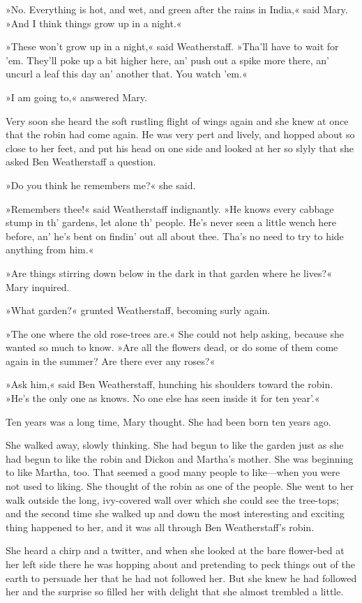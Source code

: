 »No. Everything is hot, and wet, and green after the rains in India,« said Mary. »And I think things grow up in a night.«

»These won't grow up in a night,« said Weatherstaff. »Tha'll have to wait for 'em. They'll poke up a bit higher here, an' push out a spike more there, an' uncurl a leaf this day an' another that. You watch 'em.«

»I am going to,« answered Mary.

Very soon she heard the soft rustling flight of wings again and she knew at once that the robin had come again. He was very pert and lively, and hopped about so close to her feet, and put his head on one side and looked at her so slyly that she asked Ben Weatherstaff a question.

»Do you think he remembers me?« she said.

»Remembers thee!« said Weatherstaff indignantly. »He knows every cabbage stump in th' gardens, let alone th' people. He's never seen a little wench here before, an' he's bent on findin' out all about thee. Tha's no need to try to hide anything from him.«

»Are things stirring down below in the dark in that garden where he lives?« Mary inquired.

»What garden?« grunted Weatherstaff, becoming surly again.

»The one where the old rose-trees are.« She could not help asking, because she wanted so much to know. »Are all the flowers dead, or do some of them come again in the summer? Are there ever any roses?«

»Ask him,« said Ben Weatherstaff, hunching his shoulders toward the robin. »He's the only one as knows. No one else has seen inside it for ten year'.«

Ten years was a long time, Mary thought. She had been born ten years ago.

She walked away, slowly thinking. She had begun to like the garden just as she had begun to like the robin and Dickon and Martha's mother. She was beginning to like Martha, too. That seemed a good many people to like—when you were not used to liking. She thought of the robin as one of the people. She went to her walk outside the long, ivy-covered wall over which she could see the tree-tops; and the second time she walked up and down the most interesting and exciting thing happened to her, and it was all through Ben Weatherstaff's robin.

She heard a chirp and a twitter, and when she looked at the bare flower-bed at her left side there he was hopping about and pretending to peck things out of the earth to persuade her that he had not followed her. But she knew he had followed her and the surprise so filled her with delight that she almost trembled a little.

